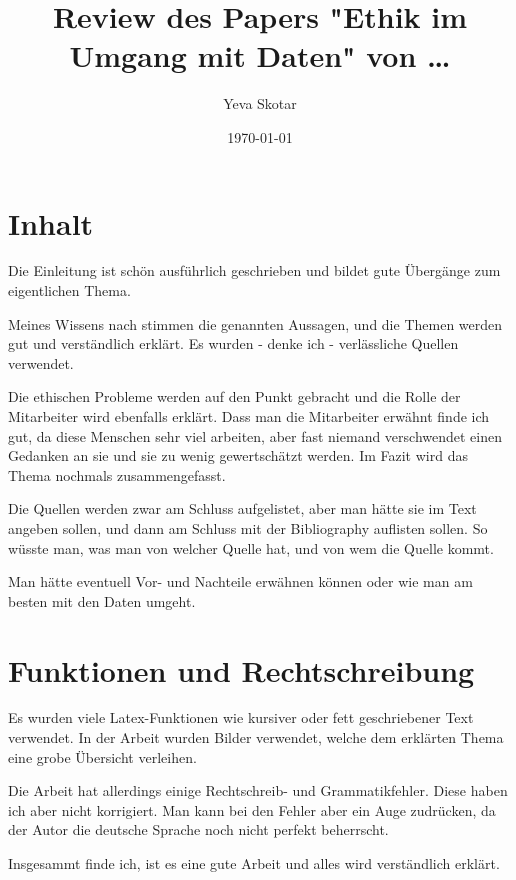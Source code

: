 \documentclass{article}
\title{Review des Papers "Ethik im Umgang mit Daten" von \dots}
\author{Yeva Skotar}
\date{\today}
\begin{document}
\maketitle


\section{Inhalt}
Die Einleitung ist schön ausführlich geschrieben und bildet gute Übergänge zum eigentlichen Thema.

Meines Wissens nach stimmen die genannten Aussagen, und  die Themen werden gut und verständlich erklärt. Es wurden - denke ich - verlässliche Quellen verwendet.

Die ethischen Probleme werden auf den Punkt gebracht und die Rolle der Mitarbeiter wird ebenfalls erklärt. Dass man die Mitarbeiter erwähnt finde ich gut, da diese Menschen sehr viel arbeiten, aber fast niemand verschwendet einen Gedanken an sie und sie zu wenig gewertschätzt werden.
Im Fazit wird das Thema nochmals zusammengefasst.
\bigskip

Die Quellen werden zwar am Schluss aufgelistet, aber man hätte sie im Text angeben sollen, und dann am Schluss mit der Bibliography auflisten sollen. So wüsste man, was man von welcher Quelle hat, und von wem die Quelle kommt.

Man hätte eventuell Vor- und Nachteile erwähnen können oder wie man am besten mit den Daten umgeht.

\section{Funktionen und Rechtschreibung}
Es wurden viele Latex-Funktionen wie kursiver oder fett geschriebener Text verwendet. In der Arbeit wurden Bilder 
verwendet, welche dem erklärten Thema eine grobe Übersicht verleihen.

Die Arbeit hat allerdings einige Rechtschreib- und Grammatikfehler. Diese haben ich aber nicht korrigiert.
Man kann bei den Fehler aber ein Auge zudrücken, da der Autor die deutsche Sprache noch nicht perfekt beherrscht.
\bigskip

Insgesammt finde ich, ist es eine gute Arbeit und alles wird verständlich erklärt.
\end{document}
